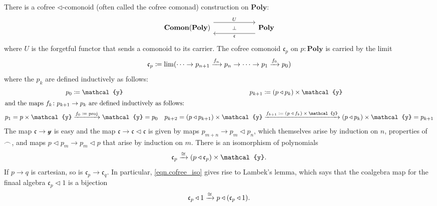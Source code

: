 \documentclass[11pt, one side, article]{memoir}
\theoremstyle{definition}
\theoremstyle{plain}
\newcommand{\Cat}[1]{\mathbf{#1}}%
\newcommand{\To}[2][]{\xrightarrow[#1]{\tn{$#2$}}}
\newcommand{\tn}[1]{\textnormal{#1}}
\newcommand{\nn}{\mathbb{N}}
\newcommand{\smset}{\Cat{Set}}
\newcommand{\yon}{{\mathcal{y}}}
\newcommand{\poly}{\Cat{Poly}}
\newcommand{\0}{\textsf{0}}
\newcommand{\1}{\tn{\textsf{1}}}
\newcommand{\tri}{\mathbin{\triangleleft}}
\newcommand{\cofree}{\mathfrak{c}}
\newcommand{\indexcoclscale}[1]{\scalebox{.7}{#1}}
\newcommand{\cocl}[1]{
	\scriptsize\overset{\,\indexcoclscale{$#1$}}{\frown}\normalsize
}
\begin{document}
There is a cofree $\tri$-comonoid (often called the cofree comonad) construction on $\poly$:
\begin{equation}\label{eqn.cofree}
\begin{tikzcd}[column sep=60pt]
	\Cat{Comon}(\poly)
  	\ar[from=r, shift left=8pt, "\cofree"]
		\ar[from=r, phantom, "\scriptstyle\bot"]
  	&
	\poly
		\ar[from=l, shift right=-8pt, "U"]
\end{tikzcd}
\end{equation}
where $U$ is the forgetful functor that sends a comonoid to its carrier. The cofree comonoid $\cofree_p$ on $p:\poly$ is carried by the limit
\begin{equation}
\cofree_p\coloneqq\lim(\cdots\to p_{n+1}\To{f_n} p_n\to\cdots\to p_1\To{f_0} p_0)
\end{equation}
where the $p_k$ are defined inductively as follows:
\begin{align}
	p_0&\coloneqq\yon&p_{k+1}&\coloneqq (p\tri p_k)\times\yon\\
\intertext{and the maps $f_k\colon p_{k+1}\to p_k$ are defined inductively as follows:}
	p_1=p\times\yon&\To{f_0\coloneqq\tn{proj}}\yon=p_0&p_{k+2}=(p\tri p_{k+1})\times\yon&\To{f_{k+1}\coloneqq(p\tri f_k)\times\yon}(p\tri p_{k})\times\yon=p_{k+1}
\end{align}
The map $\cofree\to\yon$ is easy and the map $\cofree\to\cofree\tri\cofree$ is given by maps $p_{m+n}\to p_m\tri p_n$, which themselves arise by induction on $n$, properties of $\cocl{}$, and maps $p\tri p_m\to p_m\tri p$ that  arise by induction on $m$. There is an isomorphism of polynomials
\begin{equation}\label{eqn.cofree_iso}
	\cofree_p\To{\cong} (p\tri\cofree_p)\times\yon.
\end{equation}
If $p\to q$ is cartesian, so is $\cofree_p\to\cofree_q$. In particular, \eqref{eqn.cofree_iso} gives rise to Lambek's lemma, which says that the coalgebra map for the finaal algebra $\cofree_p\tri 1$ is a bijection
\begin{equation}
		\cofree_p\tri 1\To\cong p\tri(\cofree_p\tri 1).
\end{equation}
\end{document}
